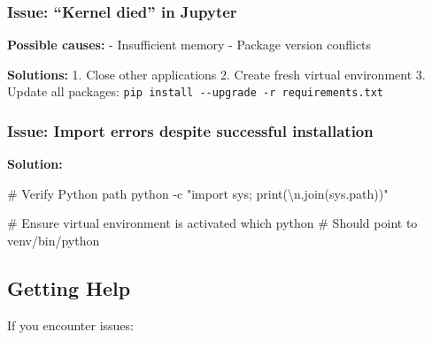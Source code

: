 \documentclass[
  11pt,
  letterpaper,
  oneside,
  openany]{book}
\newenvironment{Shaded}{\begin{snugshade}}{\end{snugshade}}
\newcommand{\AttributeTok}[1]{\textcolor[rgb]{0.40,0.45,0.13}{#1}}
\newcommand{\CommentTok}[1]{\textcolor[rgb]{0.37,0.37,0.37}{#1}}
\newcommand{\ExtensionTok}[1]{\textcolor[rgb]{0.00,0.23,0.31}{#1}}
\newcommand{\FunctionTok}[1]{\textcolor[rgb]{0.28,0.35,0.67}{#1}}
\newcommand{\NormalTok}[1]{\textcolor[rgb]{0.00,0.23,0.31}{#1}}
\newcommand{\StringTok}[1]{\textcolor[rgb]{0.13,0.47,0.30}{#1}}
\begin{document}
\subsubsection*{Issue: ``Kernel died'' in
Jupyter}\label{issue-kernel-died-in-jupyter}

\textbf{Possible causes:} - Insufficient memory - Package version
conflicts

\textbf{Solutions:} 1. Close other applications 2. Create fresh virtual
environment 3. Update all packages:
\texttt{pip\ install\ -\/-upgrade\ -r\ requirements.txt}

\subsubsection*{Issue: Import errors despite successful
installation}\label{issue-import-errors-despite-successful-installation}

\textbf{Solution:}

\begin{Shaded}
\begin{Highlighting}[]
\CommentTok{\# Verify Python path}
\ExtensionTok{python} \AttributeTok{{-}c} \StringTok{"import sys; print(\textquotesingle{}\textbackslash{}n\textquotesingle{}.join(sys.path))"}

\CommentTok{\# Ensure virtual environment is activated}
\FunctionTok{which}\NormalTok{ python  }\CommentTok{\# Should point to venv/bin/python}
\end{Highlighting}
\end{Shaded}

\subsection*{Getting Help}\label{getting-help}

If you encounter issues:
\end{document}
